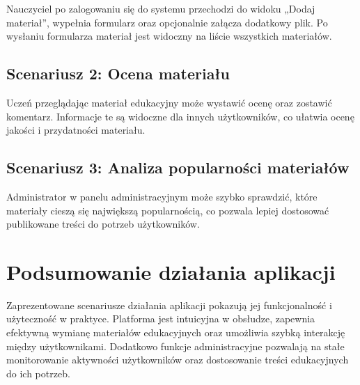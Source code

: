 Nauczyciel po zalogowaniu się do systemu przechodzi do widoku „Dodaj materiał”, wypełnia formularz oraz opcjonalnie załącza dodatkowy plik. Po wysłaniu formularza materiał jest widoczny na liście wszystkich materiałów.

\subsection{Scenariusz 2: Ocena materiału}

Uczeń przeglądając materiał edukacyjny może wystawić ocenę oraz zostawić komentarz. Informacje te są widoczne dla innych użytkowników, co ułatwia ocenę jakości i przydatności materiału.

\subsection{Scenariusz 3: Analiza popularności materiałów}

Administrator w panelu administracyjnym może szybko sprawdzić, które materiały cieszą się największą popularnością, co pozwala lepiej dostosować publikowane treści do potrzeb użytkowników.

\section{Podsumowanie działania aplikacji}

Zaprezentowane scenariusze działania aplikacji pokazują jej funkcjonalność i użyteczność w praktyce. Platforma jest intuicyjna w obsłudze, zapewnia efektywną wymianę materiałów edukacyjnych oraz umożliwia szybką interakcję między użytkownikami. Dodatkowo funkcje administracyjne pozwalają na stałe monitorowanie aktywności użytkowników oraz dostosowanie treści edukacyjnych do ich potrzeb.